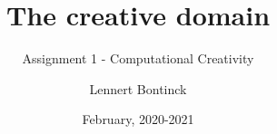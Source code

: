 \title{The creative domain}
\subtitle{Assignment 1 - Computational Creativity}
\author{Lennert Bontinck}
\date{February, 2020-2021}
